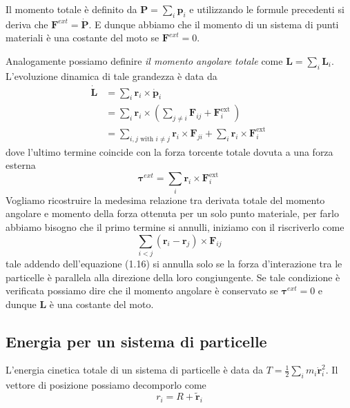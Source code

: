 Il momento totale \`{e} definito da $\bm{P} = \sum_{i}\bm{p}_i$ e utilizzando le formule precedenti si deriva che $\bm{F}^{ext} = \dot{\bm{P}}$. E dunque abbiamo che il momento di un sistema di punti materiali \`{e} una costante del moto se $\bm{F}^{ext} = 0$.

Analogamente possiamo definire \textit{il momento angolare totale} come $\bm{L} = \sum_{i} \bm{L}_{i}$. L'evoluzione dinamica di tale grandezza \`{e} data da 
\begin{equation}
\begin{aligned}
\dot{\mathbf{L}} & =\sum_i \mathbf{r}_i \times \dot{\mathbf{p}}_i \\
& =\sum_i \mathbf{r}_i \times\left(\sum_{j \neq i} \mathbf{F}_{i j}+\mathbf{F}_i^{\text {ext }}\right) \\
& =\sum_{i, j \text { with } i \neq j} \mathbf{r}_i \times \mathbf{F}_{j i}+\sum_i \mathbf{r}_i \times \mathbf{F}_i^{\text {ext }}
\end{aligned}
\end{equation}
dove l'ultimo termine coincide con la forza torcente totale dovuta a una forza esterna 
\begin{equation}
	\bm{\tau}^{ext} = \sum_i \mathbf{r}_i \times \mathbf{F}_i^{\text {ext }}
\end{equation}
Vogliamo ricostruire la medesima relazione tra derivata totale del momento angolare e momento della forza ottenuta per un solo punto materiale, per farlo abbiamo bisogno che il primo termine si annulli, iniziamo con il riscriverlo come 
\begin{equation}
\sum_{i<j}\left(\mathbf{r}_i-\mathbf{r}_j\right) \times \mathbf{F}_{i j}
\end{equation}
tale addendo dell'equazione (1.16) si annulla solo se la forza d'interazione tra le particelle \`{e} parallela alla direzione della loro congiungente. Se tale condizione \`{e} verificata possiamo dire che il momento angolare \`{e} conservato se $\bm{\tau}^{ext} = 0$ e dunque $\bm{L}$ \`{e} una costante del moto.

\subsection{Energia per un sistema di particelle}

L'energia cinetica totale di un sistema di particelle \`{e} data da $T = \frac{1}{2} \sum_i m_i \dot{\bm{r}}_i^2$. Il vettore di posizione possiamo decomporlo come 
\begin{equation}
	r_i = R + \tilde{\bm{r}}_i
\end{equation}

